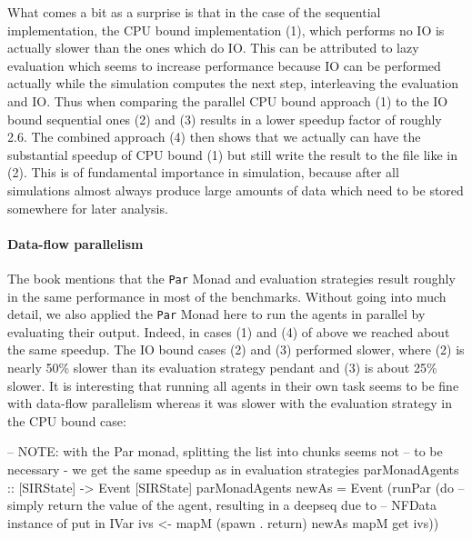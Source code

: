 What comes a bit as a surprise is that in the case of the sequential implementation, the CPU bound implementation (1), which performs no IO is actually slower than the ones which do IO. This can be attributed to lazy evaluation which seems to increase performance because IO can be performed actually while the simulation computes the next step, interleaving the evaluation and IO. Thus when comparing the parallel CPU bound approach (1) to the IO bound sequential ones (2) and (3) results in a lower speedup factor of roughly 2.6.
The combined approach (4) then shows that we actually can have the substantial speedup of CPU bound (1) but still write the result to the file like in (2). This is of fundamental importance in simulation, because after all simulations almost always produce large amounts of data which need to be stored somewhere for later analysis.

\paragraph{Data-flow parallelism} The book \cite{marlow_parallel_2013} mentions that the \texttt{Par} Monad and evaluation strategies result roughly in the same performance in most of the benchmarks. Without going into much detail, we also applied the \texttt{Par} Monad here to run the agents in parallel by evaluating their output. Indeed, in cases (1) and (4) of above we reached about the same speedup. The IO bound cases (2) and (3) performed slower, where (2) is nearly 50\% slower than its evaluation strategy pendant and (3) is about 25\% slower. It is interesting that running all agents in their own task seems to be fine with data-flow parallelism whereas it was slower with the evaluation strategy in the CPU bound case:

\begin{HaskellCode}
-- NOTE: with the Par monad, splitting the list into chunks seems not 
-- to be necessary - we get the same speedup as in evaluation strategies
parMonadAgents :: [SIRState] -> Event [SIRState]
parMonadAgents newAs = Event (runPar (do
  -- simply return the value of the agent, resulting in a deepseq due to
  -- NFData instance of put in IVar
  ivs <- mapM (spawn . return) newAs
  mapM get ivs))
\end{HaskellCode}

